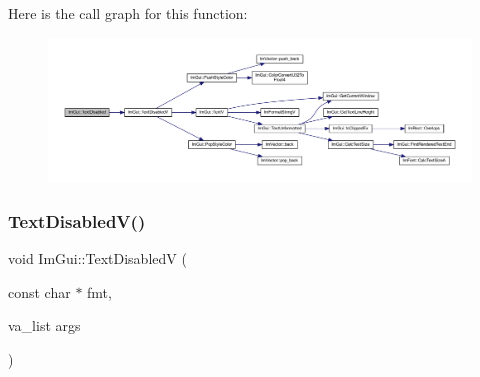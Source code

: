 Here is the call graph for this function\+:
\nopagebreak
\begin{figure}[H]
\begin{center}
\leavevmode
\includegraphics[width=350pt]{namespace_im_gui_aa96bf14c5fa288e106820aeb4ba7fcb6_cgraph}
\end{center}
\end{figure}
\mbox{\label{namespace_im_gui_a5b128d4f12d7e33e95fb9cef7dce027e}} 
\subsubsection{\texorpdfstring{Text\+Disabled\+V()}{TextDisabledV()}}
{\footnotesize\ttfamily void Im\+Gui\+::\+Text\+DisabledV (\begin{DoxyParamCaption}\item[{const char $\ast$}]{fmt,  }\item[{va\+\_\+list}]{args }\end{DoxyParamCaption})}

